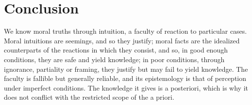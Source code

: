 \documentclass{situationist-preprint}
\begin{document}
\section{Conclusion}

We know moral truths through intuition, a faculty of reaction to particular cases. Moral intuitions are seemings, and so they justify; moral facts are the idealized counterparts of the reactions in which they consist, and so, in good enough conditions, they are safe and yield knowledge; in poor conditions, through ignorance, partiality or framing, they justify but may fail to yield knowledge. The faculty is fallible but generally reliable, and its epistemology is that of perception under imperfect conditions. The knowledge it gives is a posteriori, which is why it does not conflict with the restricted scope of the a priori.
\end{document}
